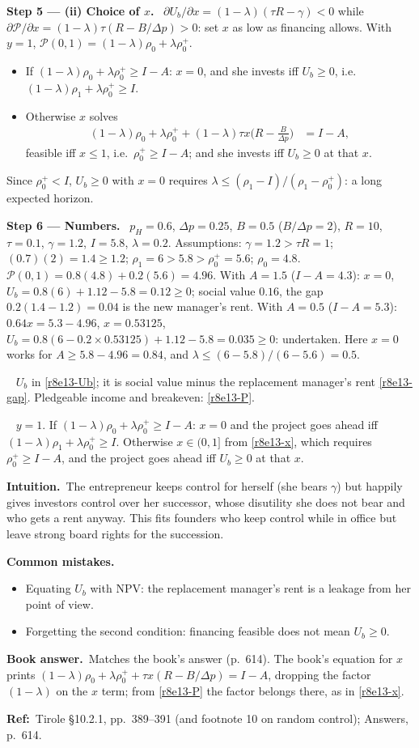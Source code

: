 \documentclass[11pt,a4paper]{article}
\newcommand{\step}[2]{\par\medskip\noindent\textbf{Step #1 --- #2.}~}
\newcommand{\intuition}{\par\medskip\noindent\textbf{Intuition.}~}
\newcommand{\bookans}{\par\medskip\noindent\textbf{Book answer.}~}
\newcommand{\refbib}{\par\smallskip\noindent\textbf{Ref:}~}
\newcommand{\answer}[1]{\par\smallskip\noindent\fbox{\textbf{Answer #1.}}~}
\newcommand{\pitfalls}{\par\medskip\noindent\textbf{Common mistakes.}}
\newcommand{\dpp}{\Delta p}
\begin{document}
\step{5}{(ii) Choice of $x$} $\partial U_b/\partial x=(1-\lambda)(\tau R-\gamma)<0$ while $\partial\mathcal P/\partial x=(1-\lambda)\tau(R-B/\dpp)>0$: set $x$ as low as financing allows. With $y=1$, $\mathcal P(0,1)=(1-\lambda)\rho_0+\lambda\rho_0^+$.
\begin{itemize}
  \item If $(1-\lambda)\rho_0+\lambda\rho_0^+\ge I-A$: $x=0$, and she invests iff $U_b\ge0$, i.e.\ $(1-\lambda)\rho_1+\lambda\rho_0^+\ge I$.
  \item Otherwise $x$ solves
  \begin{align}
    (1-\lambda)\rho_0+\lambda\rho_0^++(1-\lambda)\tau x\Big(R-\frac{B}{\dpp}\Big) &= I-A, \label{r8e13-x}
  \end{align}
  feasible iff $x\le1$, i.e.\ $\rho_0^+\ge I-A$; and she invests iff $U_b\ge0$ at that $x$.
\end{itemize}
Since $\rho_0^+<I$, $U_b\ge0$ with $x=0$ requires $\lambda\le(\rho_1-I)/(\rho_1-\rho_0^+)$: a long expected horizon.

\step{6}{Numbers} $p_H=0.6$, $\dpp=0.25$, $B=0.5$ ($B/\dpp=2$), $R=10$, $\tau=0.1$, $\gamma=1.2$, $I=5.8$, $\lambda=0.2$. Assumptions: $\gamma=1.2>\tau R=1$; $(0.7)(2)=1.4\ge1.2$; $\rho_1=6>5.8>\rho_0^+=5.6$; $\rho_0=4.8$. $\mathcal P(0,1)=0.8(4.8)+0.2(5.6)=4.96$. With $A=1.5$ ($I-A=4.3$): $x=0$, $U_b=0.8(6)+1.12-5.8=0.12\ge0$; social value $0.16$, the gap $0.2(1.4-1.2)=0.04$ is the new manager's rent. With $A=0.5$ ($I-A=5.3$): $0.64x=5.3-4.96$, $x=0.53125$, $U_b=0.8(6-0.2\times0.53125)+1.12-5.8=0.035\ge0$: undertaken. Here $x=0$ works for $A\ge5.8-4.96=0.84$, and $\lambda\le(6-5.8)/(6-5.6)=0.5$.

\answer{(i)} $U_b$ in \eqref{r8e13-Ub}; it is social value minus the replacement manager's rent \eqref{r8e13-gap}. Pledgeable income and breakeven: \eqref{r8e13-P}.
\answer{(ii)} $y=1$. If $(1-\lambda)\rho_0+\lambda\rho_0^+\ge I-A$: $x=0$ and the project goes ahead iff $(1-\lambda)\rho_1+\lambda\rho_0^+\ge I$. Otherwise $x\in(0,1]$ from \eqref{r8e13-x}, which requires $\rho_0^+\ge I-A$, and the project goes ahead iff $U_b\ge0$ at that $x$.

\intuition The entrepreneur keeps control for herself (she bears $\gamma$) but happily gives investors control over her successor, whose disutility she does not bear and who gets a rent anyway. This fits founders who keep control while in office but leave strong board rights for the succession.

\pitfalls
\begin{itemize}
  \item Equating $U_b$ with NPV: the replacement manager's rent is a leakage from her point of view.
  \item Forgetting the second condition: financing feasible does not mean $U_b\ge0$.
\end{itemize}
\bookans Matches the book's answer (p.~614). The book's equation for $x$ prints $(1-\lambda)\rho_0+\lambda\rho_0^++\tau x(R-B/\dpp)=I-A$, dropping the factor $(1-\lambda)$ on the $x$ term; from \eqref{r8e13-P} the factor belongs there, as in \eqref{r8e13-x}.
\refbib{Tirole \S10.2.1, pp.~389--391 (and footnote 10 on random control); Answers, p.~614.}
\end{document}
